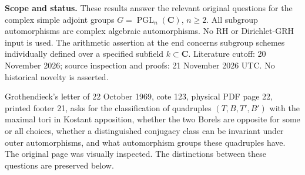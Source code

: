 \documentclass[11pt,a4paper]{article}
\theoremstyle{definition}\newtheorem{definition}[theorem]{Definition}
\theoremstyle{remark}\newtheorem{remark}[theorem]{Remark}
\begin{document}
\textbf{Scope and status.} These results answer the relevant original
questions for the complex simple adjoint groups
\(G=\operatorname{PGL}_n(\mathbf C)\), \(n\geq2\). All subgroup
automorphisms are complex algebraic automorphisms. No RH or
Dirichlet-GRH input is used. The arithmetic assertion at the end
concerns subgroup schemes individually defined over a specified subfield
\(k\subset\mathbf C\). Literature cutoff: 20 November 2026; source
inspection and proofs: 21 November 2026 UTC. No historical novelty is
asserted.

Grothendieck's letter of 22 October 1969, cote 123, physical PDF page
22, printed footer 21, asks for the classification of quadruples
\((T,B,T',B')\) with the maximal tori in Kostant apposition, whether the
two Borels are opposite for some or all choices, whether a distinguished
conjugacy class can be invariant under outer automorphisms, and what
automorphism groups these quadruples have. The original page was
visually inspected. The distinctions between these questions are
preserved below.
\end{document}

